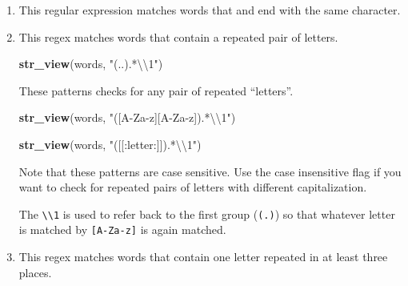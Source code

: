 \documentclass[]{book}
\newenvironment{Shaded}{\begin{snugshade}}{\end{snugshade}}
\newcommand{\CharTok}[1]{\textcolor[rgb]{0.31,0.60,0.02}{#1}}
\newcommand{\DataTypeTok}[1]{\textcolor[rgb]{0.13,0.29,0.53}{#1}}
\newcommand{\KeywordTok}[1]{\textcolor[rgb]{0.13,0.29,0.53}{\textbf{#1}}}
\newcommand{\NormalTok}[1]{#1}
\newcommand{\OperatorTok}[1]{\textcolor[rgb]{0.81,0.36,0.00}{\textbf{#1}}}
\newcommand{\OtherTok}[1]{\textcolor[rgb]{0.56,0.35,0.01}{#1}}
\newcommand{\StringTok}[1]{\textcolor[rgb]{0.31,0.60,0.02}{#1}}
\theoremstyle{plain}
\theoremstyle{remark}
\theoremstyle{definition}
\theoremstyle{definition}
\theoremstyle{definition}
\theoremstyle{remark}
\begin{document}
\begin{enumerate}
\def\labelenumi{\arabic{enumi}.}
\item
  This regular expression matches words that and end with the same
  character.

\begin{Shaded}
\end{Shaded}
\item
  This regex matches words that contain a repeated pair of letters.

\begin{Shaded}
\begin{Highlighting}[]
\KeywordTok{str_view}\NormalTok{(words, }\StringTok{"(..).*}\CharTok{\textbackslash{}\textbackslash{}}\StringTok{1"}\NormalTok{)}
\end{Highlighting}
\end{Shaded}

  These patterns checks for any pair of repeated ``letters''.

\begin{Shaded}
\begin{Highlighting}[]
\KeywordTok{str_view}\NormalTok{(words, }\StringTok{"([A-Za-z][A-Za-z]).*}\CharTok{\textbackslash{}\textbackslash{}}\StringTok{1"}\NormalTok{)}
\end{Highlighting}
\end{Shaded}

\begin{Shaded}
\begin{Highlighting}[]
\KeywordTok{str_view}\NormalTok{(words, }\StringTok{"([[:letter:]]).*}\CharTok{\textbackslash{}\textbackslash{}}\StringTok{1"}\NormalTok{)}
\end{Highlighting}
\end{Shaded}

  Note that these patterns are case sensitive. Use the case insensitive
  flag if you want to check for repeated pairs of letters with different
  capitalization.

  The \texttt{\textbackslash{}\textbackslash{}1} is used to refer back
  to the first group (\texttt{(.)}) so that whatever letter is matched
  by \texttt{{[}A-Za-z{]}} is again matched.
\item
  This regex matches words that contain one letter repeated in at least
  three places.


\end{enumerate}
\end{document}
